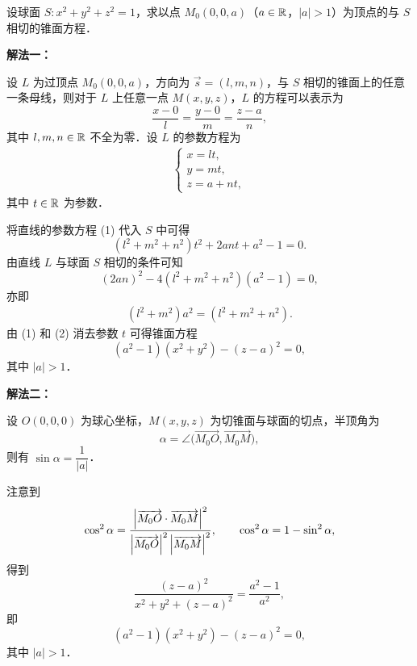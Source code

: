 
设球面 $S: x^2+y^2+z^2=1$，求以点 $M_0(0,0,a)$（$a\in\mathbb{R}$，$|a|>1$）为顶点的与 $S$ 相切的锥面方程．
\begin{solution}
\textbf{解法一：}

设 $L$ 为过顶点 $M_0(0,0,a)$，方向为 $\vec s=(l,m,n)$，与 $S$ 相切的锥面上的任意一条母线，则对于 $L$ 上任意一点 $M(x,y,z)$，$L$ 的方程可以表示为
\[
  \frac{x-0}{l}=\frac{y-0}{m}=\frac{z-a}{n},
\]
其中 $l,m,n\in\mathbb{R}$ 不全为零．设 $L$ 的参数方程为
\begin{align*}
  \begin{cases}
    x=lt,\\
    y=mt,\\
    z=a+nt,
  \end{cases}\tag{1}
\end{align*}
其中 $t\in\mathbb{R}$ 为参数．

将直线的参数方程 (1) 代入 $S$ 中可得
\[
  (l^2+m^2+n^2)t^2+2ant+a^2-1=0.
\]
由直线 $L$ 与球面 $S$ 相切的条件可知
\[
  (2an)^2-4(l^2+m^2+n^2)(a^2-1)=0,
\]
亦即
\begin{align*}
  (l^2+m^2)a^2=(l^2+m^2+n^2).\tag{2}
\end{align*}
由 (1) 和 (2) 消去参数 $t$ 可得锥面方程
\[
  (a^2-1)(x^2+y^2)-(z-a)^2=0,
\]
其中 $|a|>1$．

\textbf{解法二：}

设 $O(0,0,0)$ 为球心坐标，$M(x,y,z)$ 为切锥面与球面的切点，半顶角为
\[
  \alpha=\angle\bigl(\overrightarrow{M_0O},\overrightarrow{M_0M}\bigr),
\]
则有 $\sin\alpha=\dfrac{1}{|a|}$．

注意到
\[
  \cos^2\alpha=\frac{\left|\overrightarrow{M_0O}\cdot\overrightarrow{M_0M}\right|^2}{\left|\overrightarrow{M_0O}\right|^2\left|\overrightarrow{M_0M}\right|^2},\qquad
  \cos^2\alpha=1-\sin^2\alpha,
\]
得到
\[
  \frac{(z-a)^2}{x^2+y^2+(z-a)^2}=\frac{a^2-1}{a^2},
\]
即
\[
  (a^2-1)(x^2+y^2)-(z-a)^2=0,
\]
其中 $|a|>1$．
\end{solution}

